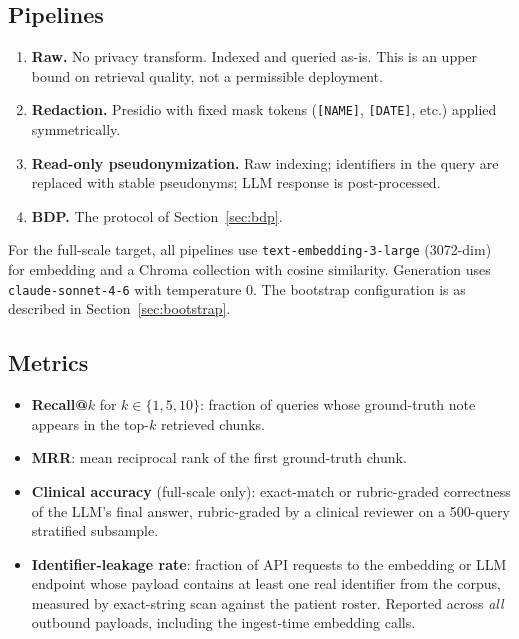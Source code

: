 \documentclass[11pt,a4paper]{article}
\begin{document}
\subsection{Pipelines}

\begin{enumerate}
  \item \textbf{Raw.} No privacy transform. Indexed and queried as-is. This
        is an upper bound on retrieval quality, not a permissible
        deployment.
  \item \textbf{Redaction.} Presidio with fixed mask tokens
        (\texttt{[NAME]}, \texttt{[DATE]}, etc.) applied symmetrically.
  \item \textbf{Read-only pseudonymization.} Raw indexing; identifiers in
        the query are replaced with stable pseudonyms; LLM response is
        post-processed.
  \item \textbf{BDP.} The protocol of Section~\ref{sec:bdp}.
\end{enumerate}

For the full-scale target, all pipelines use \texttt{text-embedding-3-large}
(3072-dim) for embedding and a Chroma collection with cosine similarity.
Generation uses \texttt{claude-sonnet-4-6} with temperature 0. The
bootstrap configuration is as described in Section~\ref{sec:bootstrap}.

\subsection{Metrics}

\begin{itemize}
  \item \textbf{Recall@$k$} for $k \in \{1, 5, 10\}$: fraction of queries
        whose ground-truth note appears in the top-$k$ retrieved chunks.
  \item \textbf{MRR}: mean reciprocal rank of the first ground-truth chunk.
  \item \textbf{Clinical accuracy} (full-scale only): exact-match or
        rubric-graded correctness of the LLM's final answer, rubric-graded
        by a clinical reviewer on a 500-query stratified subsample.
  \item \textbf{Identifier-leakage rate}: fraction of API requests to the
        embedding or LLM endpoint whose payload contains at least one real
        identifier from the corpus, measured by exact-string scan against
        the patient roster. Reported across \emph{all} outbound payloads,
        including the ingest-time embedding calls.
\end{itemize}
\end{document}
